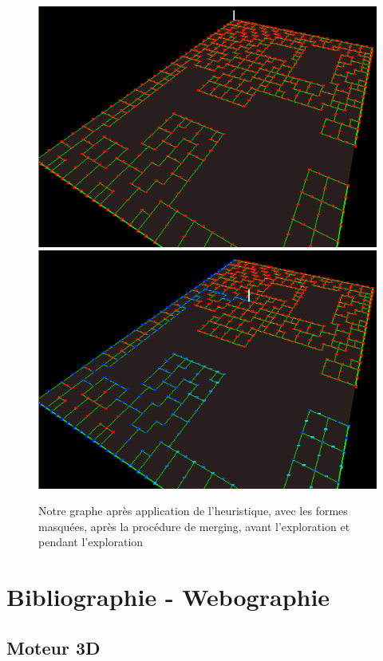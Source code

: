 \documentclass[a4paper,12pt]{report}
\begin{document}
\begin{figure}[h]
\centering
\includegraphics[scale=0.5]{Images/merging3.png}
\includegraphics[scale=0.5]{Images/parcours1.png}
\caption{Notre graphe après application de l'heuristique, avec les formes masquées, après la procédure de merging, avant l'exploration et pendant l'exploration}
\end{figure}
\vspace{0.5cm}


\chapter{Bibliographie - Webographie}

\section*{Moteur 3D}
\end{document}
